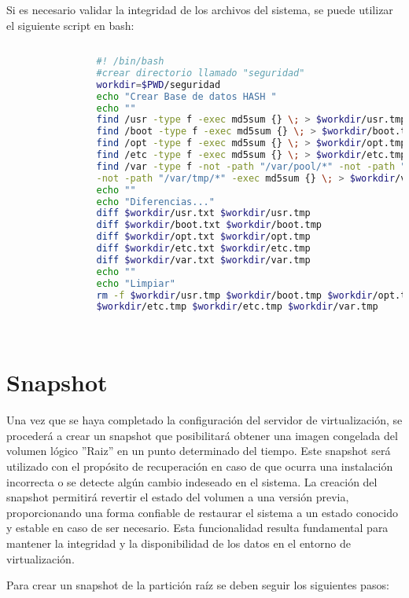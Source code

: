 			Si es necesario validar la integridad de los archivos del sistema, se puede utilizar el siguiente script en bash:
			
			\vspace{0.3cm}
			\begin{lstlisting}[language=Bash, caption=Comparar Hash]
				
				#! /bin/bash
				#crear directorio llamado "seguridad"
				workdir=$PWD/seguridad
				echo "Crear Base de datos HASH "
				echo ""
				find /usr -type f -exec md5sum {} \; > $workdir/usr.tmp
				find /boot -type f -exec md5sum {} \; > $workdir/boot.tmp
				find /opt -type f -exec md5sum {} \; > $workdir/opt.tmp
				find /etc -type f -exec md5sum {} \; > $workdir/etc.tmp
				find /var -type f -not -path "/var/pool/*" -not -path "/var/log/*" \
				-not -path "/var/tmp/*" -exec md5sum {} \; > $workdir/var.tmp
				echo ""
				echo "Diferencias..."
				diff $workdir/usr.txt $workdir/usr.tmp
				diff $workdir/boot.txt $workdir/boot.tmp
				diff $workdir/opt.txt $workdir/opt.tmp
				diff $workdir/etc.txt $workdir/etc.tmp
				diff $workdir/var.txt $workdir/var.tmp
				echo ""
				echo "Limpiar"
				rm -f $workdir/usr.tmp $workdir/boot.tmp $workdir/opt.tmp \
				$workdir/etc.tmp $workdir/etc.tmp $workdir/var.tmp
				
				
			\end{lstlisting}	
		
		\section{Snapshot}
		
	Una vez que se haya completado la configuración del servidor de virtualización, se procederá a crear un snapshot que posibilitará obtener una imagen congelada del volumen lógico ''Raiz'' en un punto determinado del tiempo. Este snapshot será utilizado con el propósito de recuperación en caso de que ocurra una instalación incorrecta o se detecte algún cambio indeseado en el sistema. La creación del snapshot permitirá revertir el estado del volumen a una versión previa, proporcionando una forma confiable de restaurar el sistema a un estado conocido y estable en caso de ser necesario. Esta funcionalidad resulta fundamental para mantener la integridad y la disponibilidad de los datos en el entorno de virtualización.\par
	
	Para crear un snapshot de la partición raíz se deben seguir los siguientes pasos:
	
